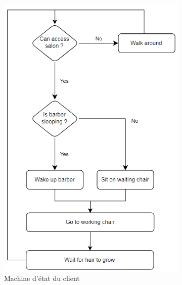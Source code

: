 \documentclass{article}
\begin{document}
\begin{figure}
    \centering
        \begin{subfigure}[b]{0.4\textwidth}
        \centering
        \includegraphics[width=\textwidth]{figures/machine_etat_client.png}
        \caption{Machine d'état du client}
        \label{fig:machine état client}
    \end{subfigure}
    \hfill
    \begin{subfigure}[b]{0.4\textwidth}
        \centering

\end{subfigure}
\end{figure}
\end{document}
